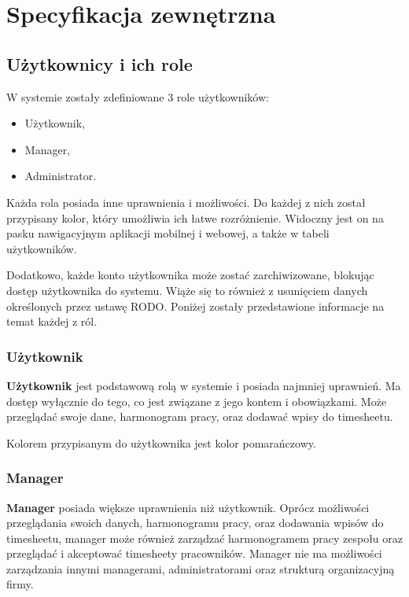 \chapter{Specyfikacja zewnętrzna}
\label{ch:04}

\section{Użytkownicy i ich role}

W systemie zostały zdefiniowane 3 role użytkowników:

\begin{itemize}
    \item Użytkownik,
    \item Manager,
    \item Administrator.
\end{itemize}

Każda rola posiada inne uprawnienia i możliwości. Do każdej z nich został przypisany kolor, który umożliwia ich łatwe rozróżnienie. Widoczny jest on na pasku nawigacyjnym aplikacji mobilnej i webowej, a także w tabeli użytkowników.

Dodatkowo, każde konto użytkownika może zostać zarchiwizowane, blokując dostęp użytkownika do systemu. Wiąże się to również z usunięciem danych określonych przez ustawę RODO. Poniżej zostały przedstawione informacje na temat każdej z ról.


\subsection{Użytkownik}

\textbf{Użytkownik} jest podstawową rolą w systemie i posiada najmniej uprawnień. Ma dostęp wyłącznie do tego, co jest związane z jego kontem i obowiązkami. Może przeglądać swoje dane, harmonogram pracy, oraz dodawać wpisy do timesheetu.

Kolorem przypisanym do użytkownika jest kolor pomarańczowy.

\subsection{Manager}

\textbf{Manager} posiada większe uprawnienia niż użytkownik. Oprócz możliwości przeglądania swoich danych, harmonogramu pracy, oraz dodawania wpisów do timesheetu, manager może również zarządzać harmonogramem pracy zespołu oraz przeglądać i akceptować timesheety pracowników. Manager nie ma możliwości zarządzania innymi managerami, administratorami oraz strukturą organizacyjną firmy.

